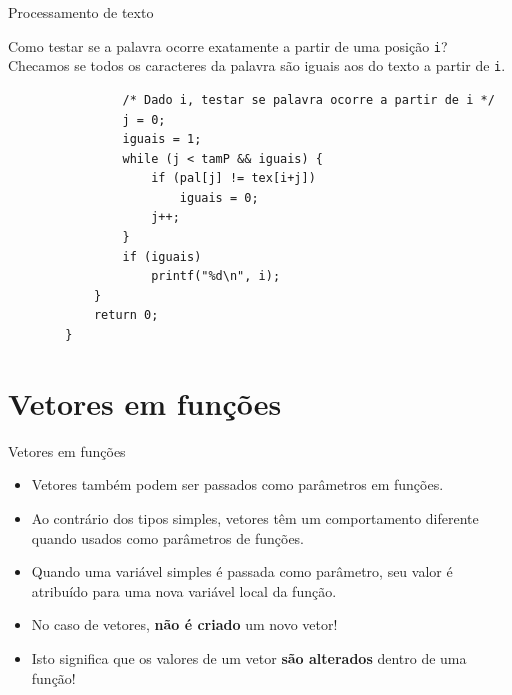 \documentclass[handout]{beamer}
\newcommand{\cod}[1]{\texttt{#1}}
\begin{document}
\begin{frame}[fragile]{Processamento de texto}
    
    Como testar se a palavra ocorre exatamente a partir de uma posição \cod{i}?
    \pause
    Checamos se todos os caracteres da palavra são iguais aos do texto a partir de \cod{i}.

    \pause
    \begin{verbatim}
                /* Dado i, testar se palavra ocorre a partir de i */
                j = 0;
                iguais = 1;
                while (j < tamP && iguais) {
                    if (pal[j] != tex[i+j])
                        iguais = 0;
                    j++;
                }
                if (iguais)
                    printf("%d\n", i);
            }
            return 0;
        }
    \end{verbatim}

\end{frame}


\section{Vetores em funções}


\begin{frame}{Vetores em funções}

    \begin{itemize}[<+->]
        \item Vetores também podem ser passados como parâmetros em funções.
        \item Ao contrário dos tipos simples, vetores têm um comportamento diferente quando usados como parâmetros de funções.
        \item Quando uma variável simples é passada como parâmetro, seu valor é atribuído para uma nova variável local da função.
        \item No caso de vetores, {\bf não é criado} um novo vetor!
        \item Isto significa que os valores de um vetor {\bf são alterados} dentro de uma função!
    \end{itemize}

\end{frame}
\end{document}
